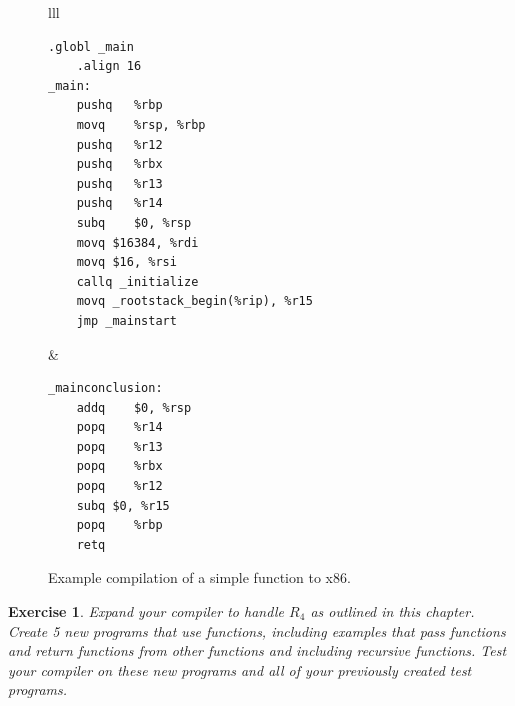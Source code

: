 \documentclass[11pt]{book}
\newtheorem{exercise}[theorem]{Exercise}
\begin{document}
\begin{figure}[tbp]
\begin{tabular}{lll}
\begin{minipage}{0.3\textwidth}
\begin{lstlisting}[basicstyle=\ttfamily\scriptsize]
	.globl _main
	.align 16
_main:
	pushq	%rbp
	movq	%rsp, %rbp
	pushq	%r12
	pushq	%rbx
	pushq	%r13
	pushq	%r14
	subq	$0, %rsp
	movq $16384, %rdi
	movq $16, %rsi
	callq _initialize
	movq _rootstack_begin(%rip), %r15
	jmp _mainstart
\end{lstlisting}
\end{minipage}
&
\begin{minipage}{0.3\textwidth}
\begin{lstlisting}[basicstyle=\ttfamily\scriptsize]
_mainconclusion:
	addq	$0, %rsp
	popq	%r14
	popq	%r13
	popq	%rbx
	popq	%r12
	subq $0, %r15
	popq	%rbp
	retq
\end{lstlisting}
\end{minipage}
\end{tabular}
\caption{Example compilation of a simple function to x86.}
\label{fig:add-fun}
\end{figure}

\begin{exercise}\normalfont
Expand your compiler to handle $R_4$ as outlined in this chapter.
Create 5 new programs that use functions, including examples that pass
functions and return functions from other functions and including
recursive functions. Test your compiler on these new programs and all
of your previously created test programs.
\end{exercise}
\end{document}
